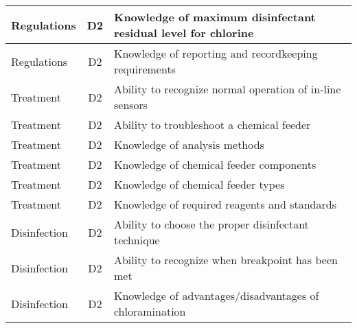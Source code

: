 \documentclass{article}
\begin{document}
\begin{table}[]
\begin{tabular}{|l|c|l|}
Regulations                            & D2             & Knowledge of maximum   disinfectant residual level for chlorine                                                                   \\ \hline
Regulations                            & D2             & Knowledge of   reporting and recordkeeping requirements                                                                           \\ \hline
Treatment                              & D2             & Ability to recognize   normal operation of in-line sensors                                                                        \\ \hline
Treatment                              & D2             & Ability to   troubleshoot a chemical feeder                                                                                       \\ \hline
Treatment                              & D2             & Knowledge of analysis   methods                                                                                                   \\ \hline
Treatment                              & D2             & Knowledge of chemical   feeder components                                                                                         \\ \hline
Treatment                              & D2             & Knowledge of chemical   feeder types                                                                                              \\ \hline
Treatment                              & D2             & Knowledge of required   reagents and standards                                                                                    \\ \hline
Disinfection                           & D2             & Ability to choose the   proper disinfectant technique                                                                             \\ \hline
Disinfection                           & D2             & Ability to recognize   when breakpoint has been met                                                                               \\ \hline
Disinfection                           & D2             & Knowledge of   advantages/disadvantages of chloramination                                                                         \\ \hline

\end{tabular}
\end{table}
\end{document}
